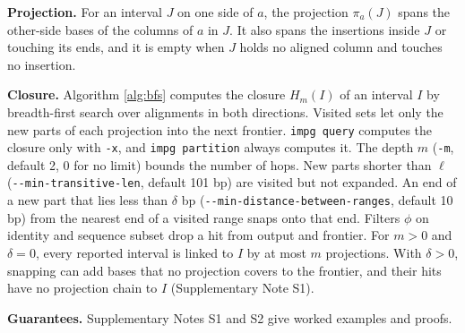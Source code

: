 \textbf{Projection.}
For an interval $J$ on one side of $a$, the projection $\pi_a(J)$ spans the other-side bases of the columns of $a$ in $J$.
It also spans the insertions inside $J$ or touching its ends, and it is empty when $J$ holds no aligned column and touches no insertion.

\textbf{Closure.}
Algorithm \ref{alg:bfs} computes the closure $H_m(I)$ of an interval $I$ by breadth-first search over alignments in both directions.
Visited sets let only the new parts of each projection into the next frontier.
\texttt{impg query} computes the closure only with \texttt{-x}, and \texttt{impg partition} always computes it.
The depth $m$ (\texttt{-m}, default 2, 0 for no limit) bounds the number of hops.
New parts shorter than $\ell$ (\texttt{-{}-min-transitive-len}, default 101 bp) are visited but not expanded.
An end of a new part that lies less than $\delta$ bp (\texttt{-{}-min-distance-between-ranges}, default 10 bp) from the nearest end of a visited range snaps onto that end.
Filters $\phi$ on identity and sequence subset drop a hit from output and frontier.
For $m>0$ and $\delta=0$, every reported interval is linked to $I$ by at most $m$ projections.
With $\delta>0$, snapping can add bases that no projection covers to the frontier, and their hits have no projection chain to $I$ (Supplementary Note S1).

\textbf{Guarantees.}
Supplementary Notes S1 and S2 give worked examples and proofs.

